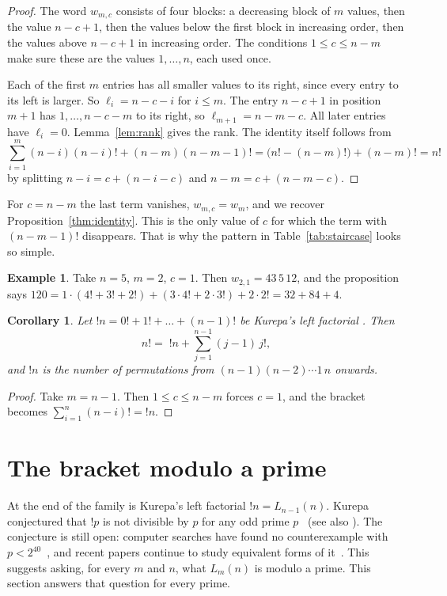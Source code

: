 \documentclass[11pt]{amsart}
\theoremstyle{plain}
\newtheorem{corollary}[theorem]{Corollary}
\theoremstyle{definition}
\newtheorem{example}[theorem]{Example}
\theoremstyle{remark}
\begin{document}
\begin{proof}
The word $w_{m,c}$ consists of four blocks: a decreasing block of $m$ values,
then the value $n-c+1$, then the values below the first block in increasing
order, then the values above $n-c+1$ in increasing order. The conditions
$1\le c\le n-m$ make sure these are the values $1,\dots,n$, each used once.

Each of the first $m$ entries has all smaller values to its right, since every
entry to its left is larger. So $\ell_i=n-c-i$ for $i\le m$. The entry
$n-c+1$ in position $m+1$ has $1,\dots,n-c-m$ to its right, so
$\ell_{m+1}=n-m-c$. All later entries have $\ell_i=0$. Lemma~\ref{lem:rank}
gives the rank. The identity itself follows from
\[
  \sum_{i=1}^{m}(n-i)(n-i)!+(n-m)(n-m-1)!=\bigl(n!-(n-m)!\bigr)+(n-m)!=n!
\]
by splitting $n-i=c+(n-i-c)$ and $n-m=c+(n-m-c)$.
\end{proof}

For $c=n-m$ the last term vanishes, $w_{m,c}=w_m$, and we recover
Proposition~\ref{thm:identity}. This is the only value of $c$ for which the term
with $(n-m-1)!$ disappears. That is why the pattern in
Table~\ref{tab:staircase} looks so simple.

\begin{example}
Take $n=5$, $m=2$, $c=1$. Then $w_{2,1}=43\,5\,12$, and the proposition says
$120=1\cdot(4!+3!+2!)+(3\cdot4!+2\cdot3!)+2\cdot2!=32+84+4$.
\end{example}

\begin{corollary}\label{cor:kurepa}
Let $!n=0!+1!+\dots+(n-1)!$ be Kurepa's left factorial \cite{Kurepa,A003422}.
Then
\[
  n!=\;!n+\sum_{j=1}^{n-1}(j-1)\,j!,
\]
and $!n$ is the number of permutations from $(n-1)(n-2)\cdots1\,n$ onwards.
\end{corollary}

\begin{proof}
Take $m=n-1$. Then $1\le c\le n-m$ forces $c=1$, and the bracket becomes
$\sum_{i=1}^{n}(n-i)!={!n}$.
\end{proof}

\section{The bracket modulo a prime}\label{sec:arith}

At the end of the family is Kurepa's left factorial $!n=L_{n-1}(n)$. Kurepa
conjectured that $!p$ is not divisible by $p$ for any odd prime
$p$~\cite{Kurepa} (see also \cite[B44]{Guy}). The conjecture is still open:
computer searches have found no counterexample with $p<2^{40}$~\cite{ABT2021},
and recent papers continue to study equivalent forms of it~\cite{Petojevic2023}.
This suggests
asking, for every $m$ and $n$, what $L_m(n)$ is modulo a prime. This section
answers that question for every prime.
\end{document}

